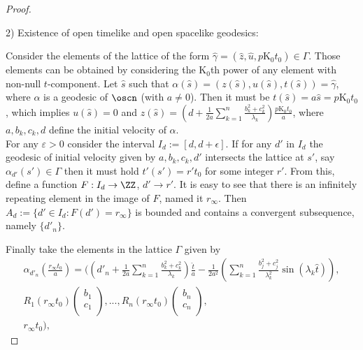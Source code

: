 \documentclass[11pt]{amsart}
\theoremstyle{plain}
\theoremstyle{definition}
\theoremstyle{remark}
\begin{document}
\begin{proof}
\begin{itemize}
			\end{itemize}
		
		
			
			2) Existence of open timelike and open spacelike geodesics:
			
		Consider the elements of the lattice of the form  $\hat{\gamma}=(\hat{z},\hat{u}, p \mathrm{K_0} t_0) \in \Gamma$. Those elements can be obtained by considering the $\mathrm{K_0}$th power of  any element with non-null $t$-component. Let $\hat{s}$ such that $\alpha(\hat{s})=(z(\hat{s}),u(\hat{s}),t(\hat{s})) = \hat{\gamma}$, where $\alpha$ is a geodesic of $\oscn$ (with $a \neq 0$). Then it must be $t(\hat{s}) = a \hat{s} = p \mathrm{K_0} t_0$, which implies $u(\hat{s})=0$ and $z(\hat{s}) = (d + \frac{1}{2 a} \sum^n_{k=1} \frac{b_k^2+ c_k^2}{\lambda_k}) \frac{p \mathrm{K_0}t_0}{a}$, where $a, b_k, c_k, d$ define the initial velocity of $\alpha$. \\
			
			For any $\varepsilon >0$ consider the interval  $I_d := [d, d+ \epsilon]$. If for any $d'$ in $I_d$ the geodesic of initial velocity given by $a, b_k,c_k, d'$  intersects the lattice at $s'$, say $\alpha_{d'}(s') \in \Gamma$ then it must hold $t'(s') = r' t_0$ for some integer $r'$. From this, define a function $F: I_d \to \ZZ$, $d'\to r'$. It is easy to see that there is an infinitely repeating element in the image of $F$, named it $r_{\infty}$. Then $A_d:= \{ d' \in I_d : F(d')= r_{\infty} \}$ is bounded and contains a convergent subsequence, namely $\{d'_n\}$.
			
			Finally take the elements in the lattice $\Gamma$ given by
			\begin{eqnarray*}
				\alpha_{d'_n}(\frac{r_{\infty} t_0}{a}) = ( (d'_n + \frac{1}{2 a} \sum_{k=1}^{n} \frac{ b_{k}^{2}+c_k^{2}}{\lambda_k})\frac{\hat{t}}{a}- \frac{1}{2 a^{2}} (  \sum_{k=1}^{n} \frac{b_{j}^{2}+c_j^2}{\lambda_k^{2}} \sin(\lambda_k \hat{t}) ), \\ 
				R_1(r_{\infty} t_0)\left( \begin{matrix}
					b_1 \\
					c_1 \\
				\end{matrix} \right),..., R_n(r_{\infty} t_0)\left( \begin{matrix}
					b_n \\
					c_n \\
				\end{matrix} \right), \\     
				r_\infty t_0 ),
			\end{eqnarray*}
			

\end{proof}
\end{document}
